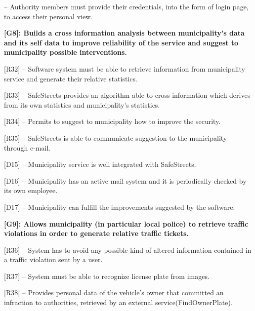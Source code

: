 \documentclass[12pt]{article}
\begin{document}
\begin{flushleft}
[R31] – Authority members must provide their credentials, into the form of login page, to access their personal view.
\vspace{2mm}

\vspace{4mm}
\textbf{ [G8]: Builds a cross information analysis between municipality’s data and its self data to improve reliability of the service and suggest to municipality possible interventions.}
\vspace{2mm}

[R32] -- Software system must be able to retrieve information from municipality service and generate their relative statistics.
\vspace{2mm}

[R33] – SafeStreets provides an algorithm able to cross information which derives from its own statistics and municipality’s statistics.
\vspace{2mm}

[R34] – Permits to suggest to municipality how to improve the security.
\vspace{2mm}

[R35] –  SafeStreets is able to communicate suggestion to the municipality through e-mail.
\vspace{2mm}

[D15] -- Municipality service is well integrated with SafeStreets.
\vspace{2mm}

[D16] -- Municipality has an active mail system and it is periodically checked by its own employee.
\vspace{2mm}

[D17] --  Municipality can fulfill the improvements suggested by the software.
\vspace{2mm}

\vspace{4mm}
\textbf{ [G9]: Allows municipality (in particular local police) to retrieve traffic violations in order to generate relative traffic tickets.}
\vspace{2mm}

[R36] -- System has to avoid any possible kind of altered information contained in a traffic violation sent by a user.
\vspace{2mm}

[R37] – System must be able to recognize license plate from images.
\vspace{2mm}

[R38] – Provides personal data of the vehicle’s owner that committed an infraction to authorities, retrieved by an external service(FindOwnerPlate).
\vspace{2mm}


\end{flushleft}
\end{document}
